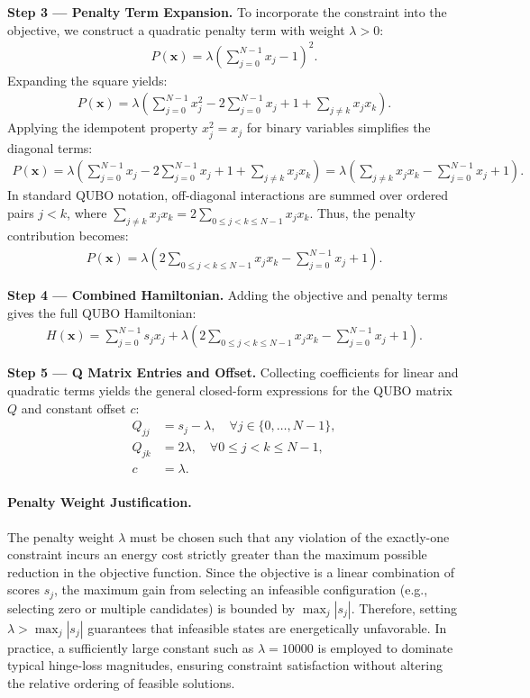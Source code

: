 \documentclass[12pt]{article}
\begin{document}
\textbf{Step 3 --- Penalty Term Expansion.} To incorporate the constraint into the objective, we construct a quadratic penalty term with weight $\lambda > 0$:
\begin{align}
  P(\mathbf{x}) = \lambda \left( \sum_{j=0}^{N-1} x_j - 1 \right)^2.
\end{align}
Expanding the square yields:
\begin{align}
  P(\mathbf{x}) = \lambda \left( \sum_{j=0}^{N-1} x_j^2 - 2\sum_{j=0}^{N-1} x_j + 1 + \sum_{j \neq k} x_j x_k \right).
\end{align}
Applying the idempotent property $x_j^2 = x_j$ for binary variables simplifies the diagonal terms:
\begin{align}
  P(\mathbf{x}) = \lambda \left( \sum_{j=0}^{N-1} x_j - 2\sum_{j=0}^{N-1} x_j + 1 + \sum_{j \neq k} x_j x_k \right) = \lambda \left( \sum_{j \neq k} x_j x_k - \sum_{j=0}^{N-1} x_j + 1 \right).
\end{align}
In standard QUBO notation, off-diagonal interactions are summed over ordered pairs $j < k$, where $\sum_{j \neq k} x_j x_k = 2 \sum_{0 \leq j < k \leq N-1} x_j x_k$. Thus, the penalty contribution becomes:
\begin{align}
  P(\mathbf{x}) = \lambda \left( 2 \sum_{0 \leq j < k \leq N-1} x_j x_k - \sum_{j=0}^{N-1} x_j + 1 \right).
\end{align}

\textbf{Step 4 --- Combined Hamiltonian.} Adding the objective and penalty terms gives the full QUBO Hamiltonian:
\begin{align}
  H(\mathbf{x}) = \sum_{j=0}^{N-1} s_j x_j + \lambda \left( 2 \sum_{0 \leq j < k \leq N-1} x_j x_k - \sum_{j=0}^{N-1} x_j + 1 \right).
\end{align}

\textbf{Step 5 --- Q Matrix Entries and Offset.} Collecting coefficients for linear and quadratic terms yields the general closed-form expressions for the QUBO matrix $Q$ and constant offset $c$:
\begin{align}
  Q_{jj} &= s_j - \lambda, \quad \forall j \in \{0, \dots, N-1\}, \\
  Q_{jk} &= 2\lambda, \quad \forall 0 \leq j < k \leq N-1, \\
  c &= \lambda.
\end{align}

\paragraph{Penalty Weight Justification.}
The penalty weight $\lambda$ must be chosen such that any violation of the exactly-one constraint incurs an energy cost strictly greater than the maximum possible reduction in the objective function. Since the objective is a linear combination of scores $s_j$, the maximum gain from selecting an infeasible configuration (e.g., selecting zero or multiple candidates) is bounded by $\max_j |s_j|$. Therefore, setting $\lambda > \max_j |s_j|$ guarantees that infeasible states are energetically unfavorable. In practice, a sufficiently large constant such as $\lambda = 10000$ is employed to dominate typical hinge-loss magnitudes, ensuring constraint satisfaction without altering the relative ordering of feasible solutions.
\end{document}
